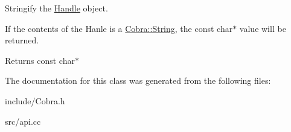 Stringify the \hyperlink{class_cobra_1_1_handle}{Handle} object. 

If the contents of the Hanle is a \hyperlink{class_cobra_1_1_string}{Cobra\+::\+String}, the const char$\ast$ value will be returned. \begin{DoxyReturn}{Returns}
const char$\ast$ 
\end{DoxyReturn}


The documentation for this class was generated from the following files\+:\begin{DoxyCompactItemize}
\item 
include/Cobra.\+h\item 
src/api.\+cc\end{DoxyCompactItemize}
